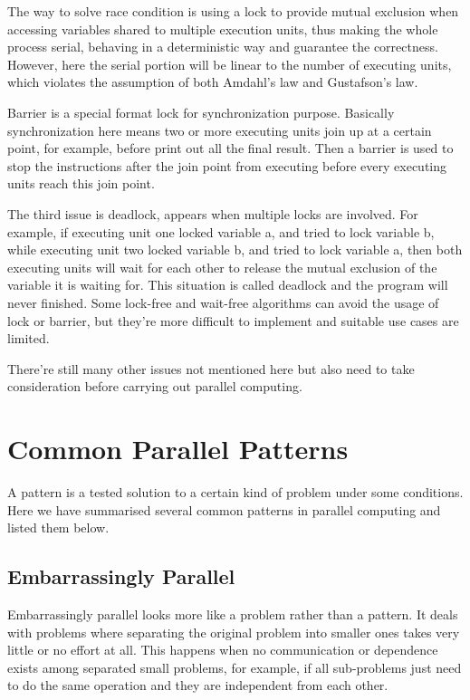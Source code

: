 \documentclass[12pt,a4]{report}
\begin{document}
The way to solve race condition is using a lock to provide mutual exclusion when accessing variables shared to multiple execution units, thus making the whole process serial, behaving in a deterministic way and guarantee the correctness. However, here the serial portion will be linear to the number of executing units, which violates the assumption of both Amdahl's law and Gustafson's law.

Barrier is a special format lock for synchronization purpose. Basically synchronization here means two or more executing units join up at a certain point, for example, before print out all the final result. Then a barrier is used to stop the instructions after the join point from executing before every executing units reach this join point.

The third issue is deadlock, appears when multiple locks are involved. For example, if executing unit one locked variable a, and tried to lock variable b, while executing unit two locked variable b, and tried to lock variable a, then both executing units will wait for each other to release the mutual exclusion of the variable it is waiting for. This situation is called deadlock and the program will never finished. Some lock-free and wait-free algorithms can avoid the usage of lock or barrier, but they're more difficult to implement and suitable use cases are limited.

There're still many other issues not mentioned here but also need to take consideration before carrying out parallel computing.

\section{Common Parallel Patterns}

A pattern is a tested solution to a certain kind of problem under some conditions. Here we have summarised several common patterns in parallel computing and listed them below.

\subsection{Embarrassingly Parallel}

Embarrassingly parallel looks more like a problem rather than a pattern. It deals with problems where separating the original problem into smaller ones takes very little or no effort at all. This happens when no communication or dependence exists among separated small problems, for example, if all sub-problems just need to do the same operation and they are independent from each other.
\end{document}
